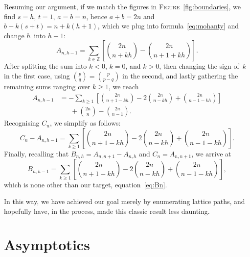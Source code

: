 \documentclass[11pt]{article}
\newcommand\fig{\textsc{Figure}}
\begin{document}
Resuming our argument, if we match the figures in
\fig~\ref{fig:boundaries}, we find \(s=h\), \(t=1\), \(a=b=n\),
hence \(a+b=2n\) and \(b+k(s+t)=n+k(h+1)\),
which we plug into formula~\eqref{eq:mohanty} and change \(h\)~into \(h-1\):
\begin{equation*}
A_{n,h-1} = \sum_{k \in \mathbb{Z}}\left[\binom{2n}{n+kh} -
           \binom{2n}{n+1+kh}\right].
\end{equation*}
After splitting the sum into \(k<0\), \(k=0\), and \(k>0\), then
changing the sign of~\(k\) in the first case, using \(\binom{p}{q} =
\binom{p}{p-q}\) in the second, and lastly gathering the remaining
sums ranging over \(k \geqslant 1\), we reach
\begin{align*}
A_{n,h-1}
  &= - \sum_{k \geqslant 1}\left[\binom{2n}{n+1-kh} -
    2\binom{2n}{n-kh} + \binom{2n}{n-1-kh}\right]\\
  &\phantom{=}\; + \binom{2n}{n} - \binom{2n}{n-1}.
\end{align*}
Recognising \(C_n\), we simplify as follows:
\begin{equation*}
C_n - A_{n,h-1}
  = \sum_{k \geqslant 1}\left[\binom{2n}{n+1-kh} -
    2\binom{2n}{n-kh} + \binom{2n}{n-1-kh}\right].
\end{equation*}
Finally, recalling that \(B_{n,h} = A_{n,n+1} - A_{n,h}\) and \(C_n =
A_{n,n+1}\), we arrive at
\begin{equation*}
B_{n,h-1} = \sum_{k \geqslant 1}
            \left[\binom{2n}{n+1-kh} - 2\binom{2n}{n-kh}
            + \binom{2n}{n-1-kh}\right],
\end{equation*}
which is none other than our target, equation~\eqref{eq:Bn}.

In this way, we have achieved our goal merely by enumerating lattice
paths, and hopefully have, in the process, made this classic result
less daunting.

\section*{Asymptotics}
\end{document}
